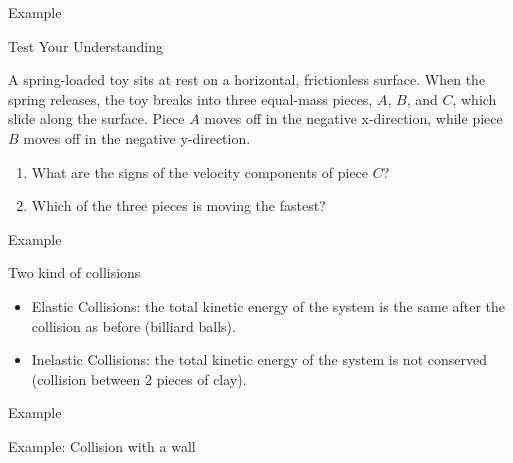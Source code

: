 \documentclass[]{beamer}
\begin{document}

\begin{frame}
    Example
    \vspace{3mm}
    
Test Your Understanding
\vspace{3mm}

A spring-loaded toy sits at rest on a horizontal, frictionless surface. When the spring releases, the toy breaks
into three equal-mass pieces, $A$, $B$, and $C$, which slide along the surface. Piece $A$
moves off in the negative x-direction, while piece $B$ moves off in the negative y-direction.
\vspace{3mm}

\begin{enumerate}
    \item What are the signs of the velocity components of piece $C$?
    \item Which of the three pieces is moving the fastest?
\end{enumerate}



    
    
    \end{frame}



\begin{frame}
    Example
    \vspace{3mm}
    
Two kind of collisions
\vspace{3mm}

\begin{itemize}
    \item Elastic Collisions: the total kinetic energy of the system is the
    same after the collision as before (billiard balls).
    \item Inelastic Collisions: the total kinetic energy of the system is not conserved 
    (collision between 2 pieces of clay).
\end{itemize}



    
    
    \end{frame}



\begin{frame}
    Example
    \vspace{3mm}
    
Example: Collision with a wall



    
    
    \end{frame}
\end{document}
